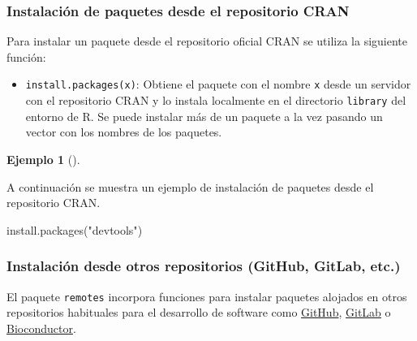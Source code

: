 \documentclass[
  a4paper,
]{scrreport}
\newenvironment{Shaded}{\begin{snugshade}}{\end{snugshade}}
\newcommand{\FunctionTok}[1]{\textcolor[rgb]{0.28,0.35,0.67}{#1}}
\newcommand{\NormalTok}[1]{\textcolor[rgb]{0.00,0.23,0.31}{#1}}
\newcommand{\StringTok}[1]{\textcolor[rgb]{0.13,0.47,0.30}{#1}}
\providecommand{\tightlist}{%
  \setlength{\itemsep}{0pt}\setlength{\parskip}{0pt}}\usepackage{longtable,booktabs,array}
\theoremstyle{definition}
\theoremstyle{definition}
\newtheorem{example}{Ejemplo}[chapter]
\theoremstyle{remark}
\begin{document}
\hypertarget{instalaciuxf3n-de-paquetes-desde-el-repositorio-cran}{%
\subsubsection{Instalación de paquetes desde el repositorio
CRAN}\label{instalaciuxf3n-de-paquetes-desde-el-repositorio-cran}}

Para instalar un paquete desde el repositorio oficial CRAN se utiliza la
siguiente función:

\begin{itemize}
\tightlist
\item
  \texttt{install.packages(x)}: Obtiene el paquete con el nombre
  \texttt{x} desde un servidor con el repositorio CRAN y lo instala
  localmente en el directorio \texttt{library} del entorno de R. Se
  puede instalar más de un paquete a la vez pasando un vector con los
  nombres de los paquetes.
\end{itemize}

\leavevmode{}%
\begin{example}[]\label{exm-instalacion-paquetes}

A continuación se muestra un ejemplo de instalación de paquetes desde el
repositorio CRAN.

\begin{Shaded}
\begin{Highlighting}[]
\FunctionTok{install.packages}\NormalTok{(}\StringTok{"devtools"}\NormalTok{)}
\end{Highlighting}
\end{Shaded}

\end{example}

\hypertarget{instalaciuxf3n-desde-otros-repositorios-github-gitlab-etc.}{%
\subsubsection{Instalación desde otros repositorios (GitHub, GitLab,
etc.)}\label{instalaciuxf3n-desde-otros-repositorios-github-gitlab-etc.}}

El paquete \texttt{remotes} incorpora funciones para instalar paquetes
alojados en otros repositorios habituales para el desarrollo de software
como \href{https://github.com/}{GitHub},
\href{httpsb://gitlab.com/}{GitLab} o
\href{https://www.bioconductor.org/}{Bioconductor}.
\end{document}
